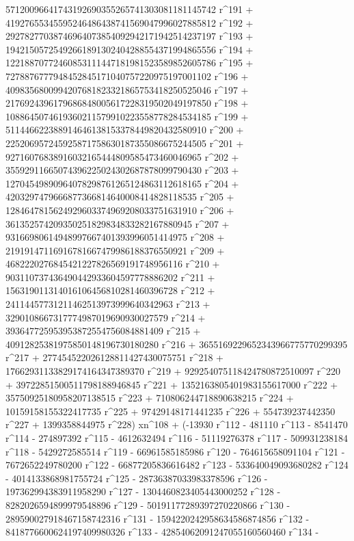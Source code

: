        57120096641743192690355265741303081181145742 r^191 + 
       41927655345595246486438741569047996027885812 r^192 + 
       29278277038746964073854092942171942514237197 r^193 + 
       19421505725492661891302404288554371994865556 r^194 + 
       12218870772460853111447181981523589852605786 r^195 + 
       7278876777948452845171040757220975197001102 r^196 + 
       4098356800994207681823321865753418250525046 r^197 + 
       2176924396179686848005617228319502049197850 r^198 + 
       1088645074619360211579910223558778284534185 r^199 + 
       511446622388914646138153378449820432580910 r^200 + 
       225206957245925871758630187355086675244505 r^201 + 
       92716076838916032165444809585473460046965 r^202 + 
       35592911665074396225024302687878099790430 r^203 + 
       12704549890964078298761265124863112618165 r^204 + 
       4203297479666877366814640008414828118535 r^205 + 
       1284647815624929603374969208033751631910 r^206 + 
       361352574209350251829834833282167880945 r^207 + 
       93166980614948997667401393996051414975 r^208 + 
       21919147116916781667479986188376550921 r^209 + 
       4682220276845421227826569191748956116 r^210 + 
       903110737436490442933604597778886202 r^211 + 
       156319011314016106456810281460396728 r^212 + 
       24114457731211462513973999640342963 r^213 + 
       3290108667317774987019690930027579 r^214 + 
       393647725953953872554756084881409 r^215 + 
       40912825381975850148196730180280 r^216 + 
       3655169229652343966775770299395 r^217 + 
       277454522026128811427430075751 r^218 + 
       17662931133829174164347389370 r^219 + 
       929254075118424780872510097 r^220 + 
       39722851500511798188946845 r^221 + 
       1352163805401983155617000 r^222 + 
       35750925180958207138515 r^223 + 710806244718890638215 r^224 + 
       10159158155322417735 r^225 + 97429148171441235 r^226 + 
       554739237442350 r^227 + 
       1399358844975 r^228) xn^108 + (-13930 r^112 - 481110 r^113 - 
       8541470 r^114 - 274897392 r^115 - 4612632494 r^116 - 
       51119276378 r^117 - 509931238184 r^118 - 5429272585514 r^119 - 
       66961585185986 r^120 - 764615658091104 r^121 - 
       7672652249780200 r^122 - 66877205836616482 r^123 - 
       533640049093680282 r^124 - 4014133868981755724 r^125 - 
       28736387033983378596 r^126 - 197362994383911958290 r^127 - 
       1304460823405443000252 r^128 - 8282026594899979548896 r^129 - 
       50191177289397270220866 r^130 - 
       289590027918467158742316 r^131 - 
       1594220242958634586874856 r^132 - 
       8418776600624197409980326 r^133 - 
       42854062091247055160560460 r^134 - 
